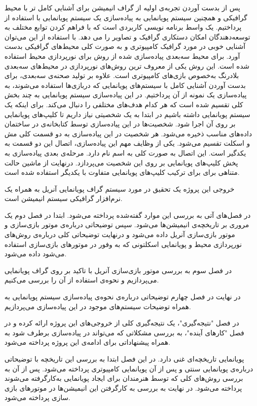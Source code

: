 پس از بدست آوردن تجربه‌ی اولیه از گراف انیمیشن برای آشنایی کامل تر 
با محیط گرافیکی و همچنین سیستم پویانمایی به پیاده‌سازی یک سیستم پویانمایی با استفاده از 
پرداختیم.
یک واسط برنامه نویسی کاربردی
است که با فراهم کردن توابع مختلف به توسعه‌دهندگان امکان دستکاری گرافیک و تصاویر را می ‌دهد.
با استفاده از این 
می‌توان آشنایی خوبی در مورد گرافیک کامپیوتری و به صورت کلی محیط‌های گرافیکی بدست آورد.
برای محیط سه‌بعدی پیاده‌سازی شده از روش 
برای نورپردازی محیط استفاده شده است. این روش یکی از معروف ترین روش‌های نورپردازی در محیط‌های سه‌بعدی بلادرنگ به‌خصوص بازی‌های کامپیوتری است. علاوه بر تولید صحنه‌ی سه‌بعدی،
برای بدست آوردن آشنایی کامل با سیستم‌های پویانمایی که دربازی‌ها استفاده می‌شوند، به پیاده‌سازی یک نمونه از آن پرداختیم.
در این پیاده‌سازی سیستم پویانمایی به چند بخش کلی تقسیم شده است که هر کدام هدف‌های مختلفی را دنبال می‌کند.
برای اینکه یک سیستم پویانمایی داشته باشیم در ابتدا به یک شخصیتی نیاز داریم 
تا کلیپ‌های پویانمایی بر روی آن اجرا شود.
شخصیت‌ها در این پیاده‌سازی توسط کتابخانه‌ی 
در ساختمان داده‌های مناسب ذخیره می‌شود.
هر شخصیت در این پیاده‌سازی به دو قسمت کلی مش و اسکلت تقسیم می‌شود.
یکی از وظایف مهم این پیاده‌سازی، اتصال این دو قسمت به یکدگیر 
است.
این اتصال به صورت کلی به اسم 
نام دارد. 
مرحله‌ی بعدی پیاده‌سازی به پخش کلیپ‌های پویانمایی بر روی این شخصیت می‌پردازد.
درنهایت از ماشین حالت متناهی برای برای ترکیب کلیپ‌های پویانمایی متفاوت با یکدیگر استفاده شده است.

خروجی این پروژه یک تحقیق در مورد سیستم گراف پویانمایی آنریل به همراه 
یک نرم‌افزار گرافیکی سیستم انیمیشن است.

در فصل‌های آتی به بررسی این موارد گفته‌شده پرداخته می‌شود.
ابتدا در فصل دوم یک مروری بر تاریخچه‌ی انیمیشن‌ها می‌شود. سپس توضیحاتی درباره‌ی موتور بازی‌سازی و 
موتور بازی‌سازی آنریل داده می‌شود و درنهایت توضیحاتی کلی 
درباره‌ی روش‌های نورپردازی محیط و پویانمایی اسکلتونی که به وفور در موتور‌های بازی‌سازی استفاده می‌شود داده می‌شود.

در فصل سوم به بررسی موتور بازی‌سازی آنریل با تاکید بر روی گراف پویانمایی می‌پردازیم و نحوه‌ی استفاده از آن را بررسی می‌کنیم.

در نهایت در فصل چهارم توضیحاتی درباره‌ی نحوه‌ی پیاده‌سازی سیستم پویانمایی
به همراه توضیحات سیستم‌های موجود در این پیاده‌سازی می‌پردازیم.

در فصل "نتیجه‌گیری"، یک نتیجه‌گیری کلی از خروجی‌های این پروژه ارائه کرده 
و در فصل "کارهای آینده"، به بررسی مشکلاتی که می‌تواند در پیاده‌سازی برطرف شود به همراه 
پیشنهاداتی برای ادامه‌ی این پروژه پرداخته می‌شود.



پویانمایی تاریخچه‌ای غنی‌ دارد. در این فصل ابتدا به بررسی این تاریخچه با توضیحاتی 
درباره‌ی پویانمایی سنتی و پس از آن پویانمایی کامپیوتری پرداخته می‌شود.
پس از آن به بررسی روش‌های کلی که توسط هنرمندان برای ایجاد پویانمایی به‌کارگرفته می‌شوند پرداخته می‌شود.
در نهایت به بررسی به کارگرفتن این انیمیشن‌ها در موتورهای بازی سازی پرداخته می‌شود.

